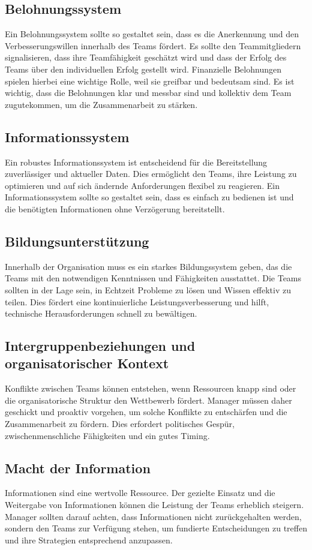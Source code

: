 \subsection{Belohnungssystem}
Ein Belohnungssystem sollte so gestaltet sein, dass es die Anerkennung und den Verbesserungswillen innerhalb des Teams fördert. 
Es sollte den Teammitgliedern signalisieren, dass ihre Teamfähigkeit geschätzt wird und dass der Erfolg des Teams über den individuellen Erfolg gestellt wird. Finanzielle Belohnungen spielen hierbei eine wichtige Rolle, weil sie greifbar und bedeutsam sind. Es ist wichtig, dass die Belohnungen klar und messbar sind und kollektiv dem Team zugutekommen, um die Zusammenarbeit zu stärken.

\subsection{Informationssystem}
Ein robustes Informationssystem ist entscheidend für die Bereitstellung zuverlässiger und aktueller Daten. 
Dies ermöglicht den Teams, ihre Leistung zu optimieren und auf sich ändernde Anforderungen flexibel zu reagieren. Ein Informationssystem sollte so gestaltet sein, dass es einfach zu bedienen ist und die benötigten Informationen ohne Verzögerung bereitstellt.
\subsection{Bildungsunterstützung}
Innerhalb der Organisation muss es ein starkes Bildungssystem geben, das die Teams mit den notwendigen Kenntnissen und Fähigkeiten ausstattet. Die Teams sollten in der Lage sein, in Echtzeit Probleme zu lösen und Wissen effektiv zu teilen. Dies fördert eine kontinuierliche Leistungsverbesserung und hilft, technische Herausforderungen schnell zu bewältigen.
\subsection{Intergruppenbeziehungen und organisatorischer Kontext}
Konflikte zwischen Teams können entstehen, wenn Ressourcen knapp sind oder die organisatorische Struktur den Wettbewerb fördert. Manager müssen daher geschickt und proaktiv vorgehen, um solche Konflikte zu entschärfen und die Zusammenarbeit zu fördern. Dies erfordert politisches Gespür, zwischenmenschliche Fähigkeiten und ein gutes Timing.
\subsection{Macht der Information}
Informationen sind eine wertvolle Ressource. Der gezielte Einsatz und die Weitergabe von Informationen können die Leistung der Teams erheblich steigern. Manager sollten darauf achten, dass Informationen nicht zurückgehalten werden, sondern den Teams zur Verfügung stehen, um fundierte Entscheidungen zu treffen und ihre Strategien entsprechend anzupassen.

